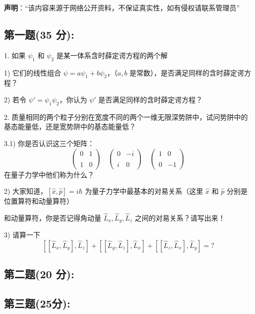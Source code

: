
\textbf{声明}：“该内容来源于网络公开资料，不保证真实性，如有侵权请联系管理员”

\subsection{第一题(35 分):}
1. 如果 $\psi_1$ 和 $\psi_2$ 是某一体系含时薛定谔方程的两个解

1) 它们的线性组合 $\psi = a\psi_1 + b\psi_2$，（$a, b$ 是常数），是否满足同样的含时薛定谔方程？

2) 若令 $\psi' = \psi_1\psi_2$，你认为 $\psi'$ 是否满足同样的含时薛定谔方程？

2. 质量相同的两个粒子分别在宽度不同的两个一维无限深势阱中，试问势阱中的基态能量低，还是宽势阱中的基态能量低？

3.1) 你是否认识这三个矩阵：
\[\begin{pmatrix}0 & 1 \\\\1 & 0\end{pmatrix}\quad\begin{pmatrix}0 & -i \\\\i & 0\end{pmatrix}\quad\begin{pmatrix}1 & 0 \\\\0 & -1\end{pmatrix}~\]
在量子力学中他们称为什么？

2) 大家知道，$[\hat{x}, \hat{p}] = i\hbar$ 为量子力学中最基本的对易关系（这里 $\hat{x}$ 和 $\hat{p}$ 分别是位置算符和动量算符）

和动量算符，你是否记得角动量 $\hat{L}_x, \hat{L}_y, \hat{L}_z$ 之间的对易关系？请写出来！

3) 请算一下
\[[[\hat{L}_x, \hat{L}_y], \hat{L}_z] + [[\hat{L}_y, \hat{L}_z], \hat{L}_x] + [[\hat{L}_z, \hat{L}_x], \hat{L}_y] = ?~\]
\subsection{第二题(20 分):}

\subsection{第三题(25分):}